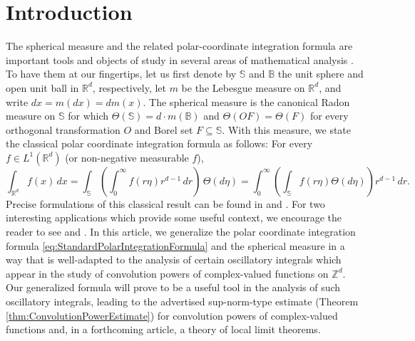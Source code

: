 \documentclass[smallextended]{svjour3}
\theoremstyle{remark}
\begin{document}
\newpage






\section{Introduction}\label{sec:Introduction}

The spherical measure and the related polar-coordinate integration formula are important tools and objects of study in several areas of mathematical analysis \cite{stein_harmonic_1993, baker_integration_1997,helms_potential_2009}. To have them at our fingertips, let us first denote by $\mathbb{S}$ and $\mathbb{B}$ the unit sphere and open unit ball in $\mathbb{R}^d$, respectively, let $m$ be the Lebesgue measure on $\mathbb{R}^d$, and write $dx=m(dx)=dm(x)$. The spherical measure is the canonical Radon measure on $\mathbb{S}$ for which $\Theta(\mathbb{S})=d\cdot m(\mathbb{B})$ and $\Theta(OF)=\Theta(F)$ for every orthogonal transformation $O$ and Borel set $F\subseteq\mathbb{S}$. With this measure, we state the classical polar coordinate integration formula as follows: For every $f\in L^1(\mathbb{R}^d)$ (or non-negative measurable $f$),
\begin{equation}\label{eq:StandardPolarIntegrationFormula}
\int_{\mathbb{R}^d}f(x)\,dx=\int_{\mathbb{S}}\left(\int_0^\infty f(r\eta)r^{d-1}\,dr\right)\,\Theta(d\eta)=\int_0^\infty\left(\int_\mathbb{S}f(r\eta)\Theta(d\eta)\right)r^{d-1}\,dr.
\end{equation}
Precise formulations of this classical result can be found in \cite{stein_real_2009} and \cite{folland_real_2013}. For two interesting applications which provide some useful context, we encourage the reader to see \cite{baker_integration_1997} and \cite{folland_how_2001}.  In this article, we generalize the polar coordinate integration formula \eqref{eq:StandardPolarIntegrationFormula} and the spherical measure in a way that is well-adapted to the analysis of certain oscillatory integrals which appear in the study of convolution powers of complex-valued functions on $\mathbb{Z}^d$. Our generalized formula will prove to be a useful tool in the analysis of such oscillatory integrals, leading to the advertised sup-norm-type estimate (Theorem \ref{thm:ConvolutionPowerEstimate}) for convolution powers of complex-valued functions and, in a forthcoming article, a theory of local limit theorems.\\ 
\end{document}

